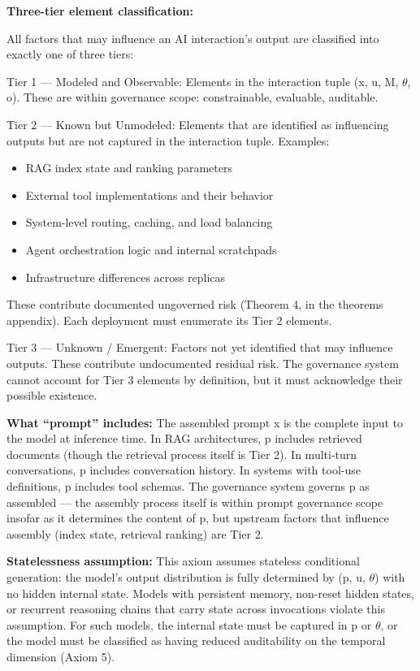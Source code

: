 \textbf{Three-tier element classification:}

\begin{cdef}
All factors that may influence an AI interaction's output are classified into exactly one of three tiers:

Tier 1 --- Modeled and Observable: Elements in the interaction tuple (x, u, M, $\theta$, o). These are within governance scope: constrainable, evaluable, auditable.

Tier 2 --- Known but Unmodeled: Elements that are identified as influencing outputs but are not captured in the interaction tuple. Examples:
\begin{itemize}
  \item RAG index state and ranking parameters
  \item External tool implementations and their behavior
  \item System-level routing, caching, and load balancing
  \item Agent orchestration logic and internal scratchpads
  \item Infrastructure differences across replicas
\end{itemize}
These contribute documented ungoverned risk (Theorem 4, in the theorems appendix).
Each deployment must enumerate its Tier 2 elements.

Tier 3 --- Unknown / Emergent: Factors not yet identified that may influence outputs. These contribute undocumented residual risk. The governance system cannot account for Tier 3 elements by definition, but it must acknowledge their possible existence.

\end{cdef}


\textbf{What ``prompt'' includes:} The assembled prompt x is the complete input to the model at inference time. In RAG architectures, p includes retrieved documents (though the retrieval process itself is Tier 2). In multi-turn conversations, p includes conversation history. In systems with tool-use definitions, p includes tool schemas. The governance system governs p as assembled --- the assembly process itself is within prompt governance scope insofar as it determines the content of p, but upstream factors that influence assembly (index state, retrieval ranking) are Tier 2.

\textbf{Statelessness assumption:} This axiom assumes stateless conditional generation: the model's output distribution is fully determined by (p, u, $\theta$) with no hidden internal state. Models with persistent memory, non-reset hidden states, or recurrent reasoning chains that carry state across invocations violate this assumption. For such models, the internal state must be captured in p or $\theta$, or the model must be classified as having reduced auditability on the temporal dimension (Axiom 5).

